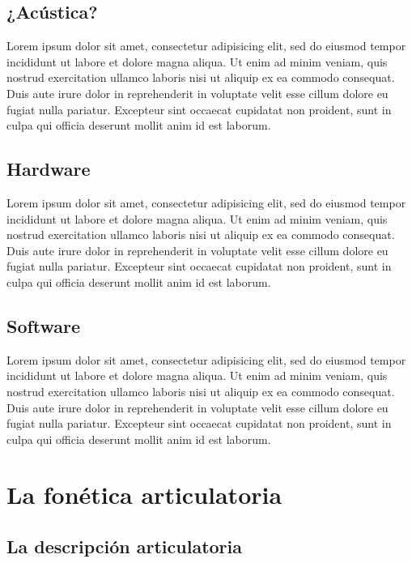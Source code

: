 \documentclass[
]{book}
\begin{document}
\hypertarget{acuxfastica}{%
\section{¿Acústica?}\label{acuxfastica}}

Lorem ipsum dolor sit amet, consectetur adipisicing elit, sed do eiusmod
tempor incididunt ut labore et dolore magna aliqua. Ut enim ad minim veniam,
quis nostrud exercitation ullamco laboris nisi ut aliquip ex ea commodo
consequat. Duis aute irure dolor in reprehenderit in voluptate velit esse
cillum dolore eu fugiat nulla pariatur. Excepteur sint occaecat cupidatat non
proident, sunt in culpa qui officia deserunt mollit anim id est laborum.

\hypertarget{hardware}{%
\section{Hardware}\label{hardware}}

Lorem ipsum dolor sit amet, consectetur adipisicing elit, sed do eiusmod
tempor incididunt ut labore et dolore magna aliqua. Ut enim ad minim veniam,
quis nostrud exercitation ullamco laboris nisi ut aliquip ex ea commodo
consequat. Duis aute irure dolor in reprehenderit in voluptate velit esse
cillum dolore eu fugiat nulla pariatur. Excepteur sint occaecat cupidatat non
proident, sunt in culpa qui officia deserunt mollit anim id est laborum.

\hypertarget{software}{%
\section{Software}\label{software}}

Lorem ipsum dolor sit amet, consectetur adipisicing elit, sed do eiusmod
tempor incididunt ut labore et dolore magna aliqua. Ut enim ad minim veniam,
quis nostrud exercitation ullamco laboris nisi ut aliquip ex ea commodo
consequat. Duis aute irure dolor in reprehenderit in voluptate velit esse
cillum dolore eu fugiat nulla pariatur. Excepteur sint occaecat cupidatat non
proident, sunt in culpa qui officia deserunt mollit anim id est laborum.

\hypertarget{descripcion-articulatoria}{%
\chapter{La fonética articulatoria}\label{descripcion-articulatoria}}

\hypertarget{la-descripciuxf3n-articulatoria}{%
\section{La descripción articulatoria}\label{la-descripciuxf3n-articulatoria}}
\end{document}
